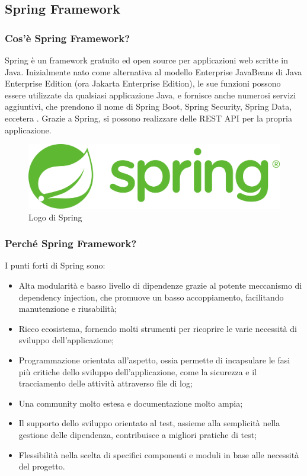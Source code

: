         \subsection{Spring Framework}
            \subsubsection{Cos'è Spring Framework?}
                Spring è un framework gratuito ed open source per applicazioni web scritte in Java. Inizialmente nato come alternativa al modello Enterprise JavaBeans di Java Enterprise Edition (ora Jakarta Enterprise Edition), le sue funzioni possono essere utilizzate da qualsiasi applicazione Java, e fornisce anche numerosi servizi aggiuntivi, che prendono il nome di Spring Boot, Spring Security, Spring Data, eccetera \cite{Wikipedia4}. Grazie a Spring, si possono realizzare delle REST API per la propria applicazione.
            \begin{figure}[htbp!]
                \centering
                \includegraphics[width=0.5\linewidth]{Immagini/System Design/Spring.png}
                \caption{Logo di Spring}
            \end{figure}
            \subsubsection{Perché Spring Framework? \cite{Spoclearn1}}
                I punti forti di Spring sono:
                \begin{itemize}
                    \item Alta modularità e basso livello di dipendenze grazie al potente meccanismo di dependency injection, che promuove un basso accoppiamento, facilitando manutenzione e riusabilità;
                    \item  Ricco ecosistema, fornendo molti strumenti per ricoprire le varie necessità di sviluppo dell'applicazione;
                    \item Programmazione orientata all'aspetto, ossia permette di incapsulare le fasi più critiche dello sviluppo dell'applicazione, come la sicurezza e il tracciamento delle attività attraverso file di log;
                    \item Una community molto estesa e documentazione molto ampia;
                    \item Il supporto dello sviluppo orientato al test, assieme alla semplicità nella gestione delle dipendenza, contribuisce a migliori pratiche di test;
                    \item Flessibilità nella scelta di specifici componenti e moduli in base alle necessità del progetto.
                \end{itemize}